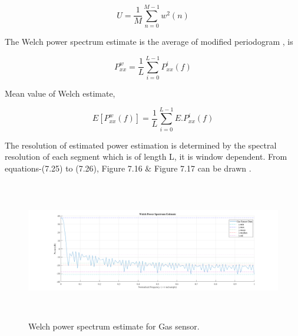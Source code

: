 \begin{enumerate}[label=\roman*]
\begin{equation}\tag{7.24}
U=\frac{1}{M} \sum _{n=0}^{M-1}w^{2} ( n )
\end{equation}
\begin{justify}
The Welch power spectrum estimate is the average of modified periodogram \cite{cheikhrouhou2018hybrid}, is
\end{justify}\par


\begin{equation}\tag{7.25}
P_{xx}^{w}=\frac{1}{L} \sum _{i=0}^{L-1}P_{xx}^{i} ( f )
\end{equation}
\begin{justify}
Mean value of Welch estimate,
\end{justify}\par


\begin{equation}\tag{7.26}
E [ P_{xx}^{w} ( f )  ] =\frac{1}{L} \sum _{i=0}^{L-1}E.P_{xx}^{i} ( f )
\end{equation}
\begin{justify}
The resolution of estimated power estimation is determined by the spectral resolution of each segment which is of length L, it is window dependent. From equations-(7.25) to (7.26), Figure 7.16 $\&$  Figure 7.17 can be drawn \cite{chatterjee2018artificial}.
\end{justify}\par




\begin{figure}[H]
	\begin{Center}
		\includegraphics[width=6.61in,height=2.4in]{31}
		\caption{Welch power spectrum estimate for Gas sensor.}
		\label{fig:_17_Welch_power_spectrum_estimate_for_Gas_sensor}
	\end{Center}
\end{figure}



\end{enumerate}
